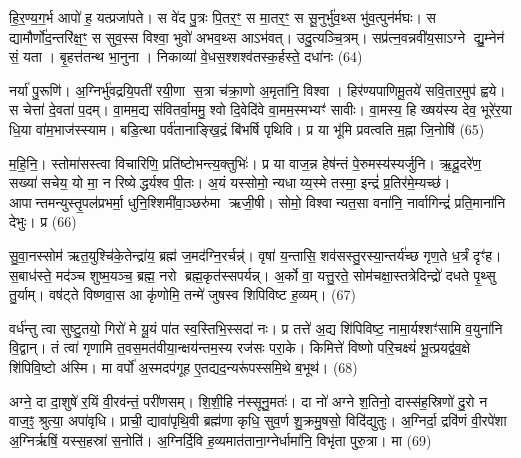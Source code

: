 {\anuvakamend[{विश॑मे॒व ति॑ष्ठन्त्ये॒तामे॒वाथै॒न्द्रस्य॑ याज्यानुवा॒क्ये॑ तं वरु॑णाय॒ चतु॑र्दश च।11।}]}


हि॒र॒ण्य॒ग॒र्भ आपो॑ ह॒ यत्प्रजा॑पते। स वे॑द पु॒त्रः पि॒तर॒ꣳ॒ स मा॒तर॒ꣳ॒ स सू॒नुर्भु॑व॒थ्स भु॑व॒त्पुन॑र्मघः। स द्यामौर्णो॑द॒न्तरि॑क्ष॒ꣳ॒ स सुव॒स्स विश्वा॒ भुवो॑ अभव॒थ्स आऽभ॑वत्। उदु॒त्यञ्चि॒त्रम्। सप्र॑त्न॒वन्नवी॑य॒साऽग्ने द्यु॒म्नेन॑ सं॒ यता। बृ॒हत्त॑तन्थ भा॒नुना। निकाव्या॑ वे॒धस॒श्शश्व॑तस्क॒र्\mbox{}हस्ते॒ दधा॑नः (64)

नर्या॑ पु॒रूणि॑। अ॒ग्निर्भु॑वद्रयि॒पती॑ रयी॒णा स॒त्रा च॑क्रा॒णो अ॒मृता॑नि॒ विश्वा। हिर॑ण्यपाणिमू॒तये॑ सवि॒तार॒मुप॑ ह्वये। स चेत्ता॑ दे॒वता॑ प॒दम्। वा॒मम॒द्य स॑वितर्वा॒ममु॒ श्वो दि॒वेदि॑वे वा॒मम॒स्मभ्यꣳ॑ सावीः। वा॒मस्य॒ हि ख्षय॑स्य देव॒ भूरे॑र॒या धि॒या वा॑म॒भाज॑स्स्याम। बडि॒त्था पर्व॑तानाङ्खि॒द्रं बि॑भर्\mbox{}षि पृथिवि। प्र या भू॑मि प्रवत्वति म॒ह्ना जि॒नोषि॑ (65)

म॒हि॒नि॒। स्तोमा॑सस्त्वा विचारिणि॒ प्रति॑ष्टोभन्त्य॒क्तुभिः॑। प्र या वाज॒न्न हेष॑न्तं पे॒रुमस्य॑स्यर्जुनि। ऋ॒दू॒दरे॑ण॒ सख्या॑ सचेय॒ यो मा॒ न रिष्येद्धर्यश्व पी॒तः। अ॒यं यस्सोमो॒ न्यधाय्य॒स्मे तस्मा॒ इन्द्रं॑ प्र॒तिर॑मे॒म्यच्छ॑। आपान्तमन्युस्तृ॒पल॑प्रभर्मा॒ धुनि॒श्शिमी॑वा॒ञ्छरु॑मा ऋजी॒षी। सोमो॒ विश्वान्यत॒सा वना॑नि॒ नार्वागिन्द्रं॑ प्रति॒माना॑नि देभुः। प्र (66)

सु॒वा॒नस्सोम॑ ऋत॒युश्चि॑के॒तेन्द्रा॑य॒ ब्रह्म॑ ज॒मद॑ग्नि॒रर्चन्न्॑। वृषा॑ य॒न्तासि॒ शव॑सस्तु॒रस्या॒न्तर्य॑च्छ गृण॒ते ध॒र्त्रं दृꣳ॑ह। स॒बाध॑स्ते॒ मद॑ञ्च शुष्म॒यञ्च॒ ब्रह्म॒ नरो ब्रह्म॒कृत॑स्सपर्यन्न्। अ॒र्को वा॒ यत्तु॒रते॒ सोम॑चक्षा॒स्तत्रेदिन्द्रो॑ दधते पृ॒थ्सु तु॒र्याम्। वष॑ट्ते विष्णवा॒स आ कृ॑णोमि॒ तन्मे॑ जुषस्व शिपिविष्ट ह॒व्यम्। (67)

वर्ध॑न्तु त्वा सुष्टु॒तयो॒ गिरो॑ मे यू॒यं पा॑त स्व॒स्तिभि॒स्सदा॑ नः। प्र तत्ते॑ अ॒द्य शि॑पिविष्ट॒ नामा॒र्यश्शꣳ॑सामि व॒युना॑नि वि॒द्वान्। तं त्वा॑ गृणामि त॒वस॒मत॑वीया॒न्क्षय॑न्तम॒स्य रज॑सः परा॒के। किमित्ते॑ विष्णो परि॒चक्ष्यं॑ भू॒त्प्रयद्व॑व॒क्षे शि॑पिवि॒ष्टो अ॑स्मि। मा वर्पो॑ अ॒स्मदप॑गूह ए॒तद्यद॒न्यरू॑पस्समि॒थे ब॒भूथ॑। (68)

अग्ने॒ दा दा॒शुषे॑ र॒यिं वी॒रव॑न्तं॒ परी॑णसम्। शि॒शी॒हि न॑स्सूनु॒मतः॑। दा नो॑ अग्ने श॒तिनो॒ दास्स॑ह॒स्रिणो॑ दु॒रो न वाज॒ꣵ॒ श्रुत्या॒ अपा॑वृधि। प्राची॒ द्यावा॑पृथि॒वी ब्रह्म॑णा कृधि॒ सुव॒र्ण शु॒क्रमु॒षसो॒ विदि॑द्युतुः। अ॒ग्निर्दा॒ द्रवि॑णं वी॒रपे॑शा अ॒ग्निर्\mbox{}ऋषिं॒ यस्स॒हस्रा॑ स॒नोति॑। अ॒ग्निर्दि॒वि ह॒व्यमात॑ताना॒ग्नेर्धामा॑नि॒ विभृ॑ता पुरु॒त्रा। मा (69)

